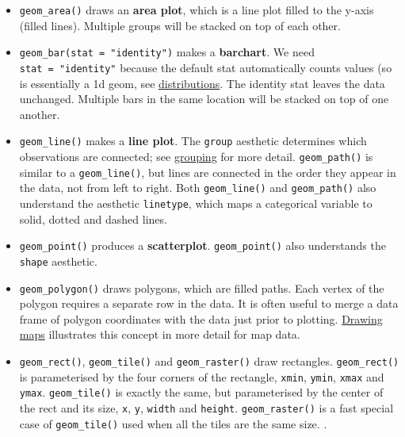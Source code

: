 \begin{itemize}
\item
  \texttt{geom\_area()} draws an \textbf{area plot}, which is a line
  plot filled to the y-axis (filled lines). Multiple groups will be
  stacked on top of each other.  
\item
  \texttt{geom\_bar(stat\ =\ "identity")} makes a \textbf{barchart}. We
  need \texttt{stat\ =\ "identity"} because the default stat
  automatically counts values (so is essentially a 1d geom, see
  \hyperref[sec:distributions]{distributions}. The identity stat leaves
  the data unchanged. Multiple bars in the same location will be stacked
  on top of one another. 
\item
  \texttt{geom\_line()} makes a \textbf{line plot}. The \texttt{group}
  aesthetic determines which observations are connected; see
  \hyperref[sec:grouping]{grouping} for more detail.
  \texttt{geom\_path()} is similar to a \texttt{geom\_line()}, but lines
  are connected in the order they appear in the data, not from left to
  right. Both \texttt{geom\_line()} and \texttt{geom\_path()} also
  understand the aesthetic \texttt{linetype}, which maps a categorical
  variable to solid, dotted and dashed lines. 
   
\item
  \texttt{geom\_point()} produces a \textbf{scatterplot}.
  \texttt{geom\_point()} also understands the \texttt{shape} aesthetic.
\item
  \texttt{geom\_polygon()} draws polygons, which are filled paths. Each
  vertex of the polygon requires a separate row in the data. It is often
  useful to merge a data frame of polygon coordinates with the data just
  prior to plotting. \hyperref[sec:maps]{Drawing maps} illustrates this
  concept in more detail for map data. 
\item
  \texttt{geom\_rect()}, \texttt{geom\_tile()} and
  \texttt{geom\_raster()} draw rectangles. \texttt{geom\_rect()} is
  parameterised by the four corners of the rectangle, \texttt{xmin},
  \texttt{ymin}, \texttt{xmax} and \texttt{ymax}. \texttt{geom\_tile()}
  is exactly the same, but parameterised by the center of the rect and
  its size, \texttt{x}, \texttt{y}, \texttt{width} and \texttt{height}.
  \texttt{geom\_raster()} is a fast special case of
  \texttt{geom\_tile()} used when all the tiles are the same size.
    .
   
\end{itemize}

